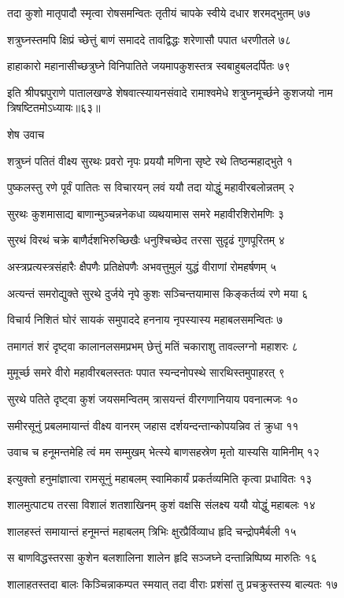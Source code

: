 तदा कुशो मातृपादौ स्मृत्वा रोषसमन्वितः
तृतीयं चापके स्वीये दधार शरमद्भुतम् ७७

शत्रुघ्नस्तमपि क्षिप्रं च्छेत्तुं बाणं समाददे
तावद्विद्धः शरेणासौ पपात धरणीतले ७८

हाहाकारो महानासीच्छत्रुघ्ने विनिपातिते
जयमापकुशस्तत्र स्वबाहुबलदर्पितः ७९

इति श्रीपद्मपुराणे पातालखण्डे शेषवात्स्यायनसंवादे रामाश्वमेधे शत्रुघ्नमूर्च्छने कुशजयो नाम त्रिषष्टितमोऽध्यायः॥६३॥


शेष उवाच

शत्रुघ्नं पतितं वीक्ष्य सुरथः प्रवरो नृपः
प्रययौ मणिना सृष्टे रथे तिष्ठन्महाद्भुते १

पुष्कलस्तु रणे पूर्वं पातितः स विचारयन्
लवं ययौ तदा योद्धुं महावीरबलोन्नतम् २

सुरथः कुशमासाद्य बाणान्मुञ्चन्ननेकधा
व्यथयामास समरे महावीरशिरोमणिः ३

सुरथं विरथं चक्रे बाणैर्दशभिरुच्छिखैः
धनुश्चिच्छेद तरसा सुदृढं गुणपूरितम् ४

अस्त्रप्रत्यस्त्रसंहारैः क्षैपणैः प्रतिक्षेपणैः
अभवत्तुमुलं युद्धं वीराणां रोमहर्षणम् ५

अत्यन्तं समरोद्युक्ते सुरथे दुर्जये नृपे
कुशः सञ्चिन्तयामास किङ्कर्तव्यं रणे मया ६

विचार्य निशितं घोरं सायकं समुपाददे
हननाय नृपस्यास्य महाबलसमन्वितः ७

तमागतं शरं दृष्ट्वा कालानलसमप्रभम्
छेत्तुं मतिं चकाराशु तावल्लग्नो महाशरः ८

मुमूर्च्छ समरे वीरो महावीरबलस्ततः
पपात स्यन्दनोपस्थे सारथिस्तमुपाहरत् ९

सुरथे पतिते दृष्ट्वा कुशं जयसमन्वितम्
त्रासयन्तं वीरगणानियाय पवनात्मजः १०

समीरसूनुं प्रबलमायान्तं वीक्ष्य वानरम्
जहास दर्शयन्दन्तान्कोपयन्निव तं क्रुधा ११

उवाच च हनूमन्तमेहि त्वं मम सम्मुखम्
भेत्स्ये बाणसहस्रेण मृतो यास्यसि यामिनीम् १२

इत्युक्तो हनुमांज्ञात्वा रामसूनुं महाबलम्
स्वामिकार्यं प्रकर्तव्यमिति कृत्वा प्रधावितः १३

शालमुत्पाट्य तरसा विशालं शतशाखिनम्
कुशं वक्षसि संलक्ष्य ययौ योद्धुं महाबलः १४

शालहस्तं समायान्तं हनूमन्तं महाबलम्
त्रिभिः क्षुरप्रैर्विव्याध हृदि चन्द्रोपमैर्बली १५

स बाणविद्धस्तरसा कुशेन बलशालिना
शालेन हृदि सञ्जघ्ने दन्तान्निष्पिष्य मारुतिः १६

शालाहतस्तदा बालः किञ्चिन्नाकम्पत स्मयात्
तदा वीराः प्रशंसां तु प्रचक्रुस्तस्य बाल्यतः १७

